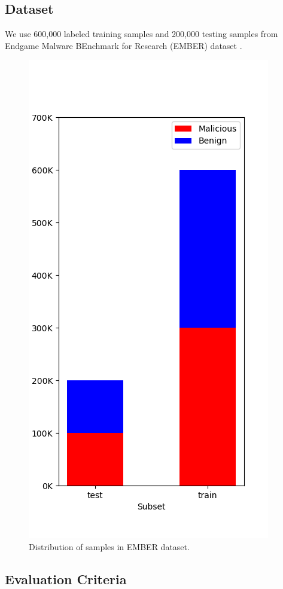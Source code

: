 \documentclass[runningheads]{llncs}
\begin{document}
\subsection{Dataset}

We use 600,000 labeled training samples and 200,000 testing samples from Endgame Malware BEnchmark for Research (EMBER) dataset \cite{anderson2018ember}.

\begin{figure}[H]
\centering
\includegraphics[scale=0.4]{dataset.png}
\caption{Distribution of samples in EMBER dataset.}
\label{fig:ember}
\end{figure}

\subsection{Evaluation Criteria}
\end{document}
